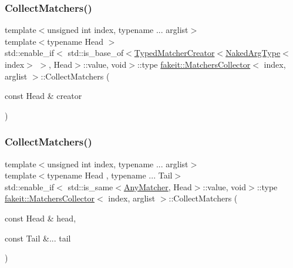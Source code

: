 \subsubsection{\texorpdfstring{CollectMatchers()}{CollectMatchers()}\hspace{0.1cm}{\footnotesize\ttfamily [38/63]}}
{\footnotesize\ttfamily template$<$unsigned int index, typename ... arglist$>$ \\
template$<$typename Head $>$ \\
std\+::enable\+\_\+if$<$ std\+::is\+\_\+base\+\_\+of$<$\mbox{\hyperlink{structfakeit_1_1TypedMatcherCreator}{Typed\+Matcher\+Creator}}$<$\mbox{\hyperlink{classfakeit_1_1MatchersCollector_aeda8ced6a2f0cb7c6e4f916f18a91730}{Naked\+Arg\+Type}}$<$index$>$ $>$, Head$>$\+::value, void$>$\+::type \mbox{\hyperlink{classfakeit_1_1MatchersCollector}{fakeit\+::\+Matchers\+Collector}}$<$ index, arglist $>$\+::Collect\+Matchers (\begin{DoxyParamCaption}\item[{const Head \&}]{creator }\end{DoxyParamCaption})\hspace{0.3cm}{\ttfamily [inline]}}

\mbox{\label{classfakeit_1_1MatchersCollector_a5bc97a3d729b1bb67e372181ad88b77d}} 
\subsubsection{\texorpdfstring{CollectMatchers()}{CollectMatchers()}\hspace{0.1cm}{\footnotesize\ttfamily [39/63]}}
{\footnotesize\ttfamily template$<$unsigned int index, typename ... arglist$>$ \\
template$<$typename Head , typename ... Tail$>$ \\
std\+::enable\+\_\+if$<$ std\+::is\+\_\+same$<$\mbox{\hyperlink{structfakeit_1_1AnyMatcher}{Any\+Matcher}}, Head$>$\+::value, void$>$\+::type \mbox{\hyperlink{classfakeit_1_1MatchersCollector}{fakeit\+::\+Matchers\+Collector}}$<$ index, arglist $>$\+::Collect\+Matchers (\begin{DoxyParamCaption}\item[{const Head \&}]{head,  }\item[{const Tail \&...}]{tail }\end{DoxyParamCaption})\hspace{0.3cm}{\ttfamily [inline]}}

